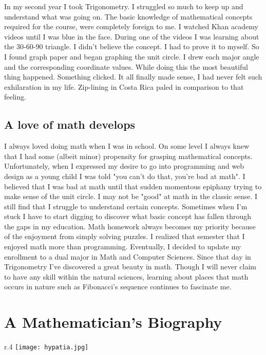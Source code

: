 \documentclass[oneside]{book}
\begin{document}
In my second year I took Trigonometry. I struggled so much to keep up and understand what was going on. The basic knowledge of mathematical concepts required for the course, were completely foreign to me. I watched Khan academy videos until I was blue in the face. During one of the videos I was learning about the 30-60-90 triangle. I didn't believe the concept. I had to prove it to myself. So I found graph paper and began graphing the unit circle. I drew each major angle and the corresponding coordinate values. While doing this the most beautiful thing happened. Something clicked. It all finally made sense, I had never felt such exhilaration in my life. Zip-lining in Costa Rica paled in comparison to that feeling. 

\section{A love of math develops}
I always loved doing math when I was in school. On some level I always knew that I had some (albeit minor) propensity for grasping mathematical concepts. Unfortunately, when I expressed my desire to go into programming and web design as a young child I was told "you can't do that, you're bad at math". I believed that I was bad at math until that sudden momentous epiphany trying to make sense of the unit circle. I may not be "good" at math in the classic sense. I still find that I struggle to understand certain concepts. Sometimes when I'm stuck I have to start digging to discover what basic concept has fallen through the gaps in my education. Math homework always becomes my priority because of the enjoyment from simply solving puzzles. I realized that semester that I enjoyed math more than programming. Eventually, I decided to update my enrollment to a dual major in Math and Computer Sciences. Since that day in Trigonometry I've discovered a great beauty in math. Though I will never claim to have any skill within the natural sciences, learning about places that math occurs in nature such as Fibonacci's sequence continues to fascinate me.

\cite{myBook}

\chapter{A Mathematician's Biography}

\begin{wrapfigure}{r}{.4\textwidth}
\centering
\texttt{[image: hypatia.jpg]}
\end{wrapfigure}
\end{document}
